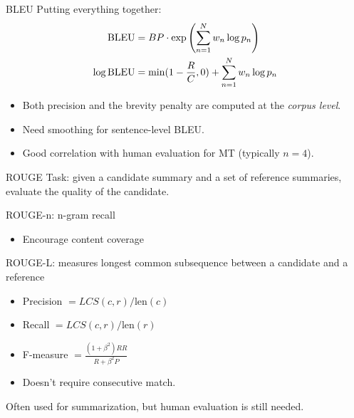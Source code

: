 \documentclass[usenames,dvipsnames,notes]{beamer}
\begin{document}
\begin{frame}
    {BLEU}
    Putting everything together:
    \begin{align*}
        \text{BLEU} &= BP\cdot \exp\left( \sum_{n=1}^N w_n \log p_n \right) \\
        \log \text{BLEU} &= \min(1-\frac{R}{C}, 0) + \sum_{n=1}^N w_n \log p_n
    \end{align*}

    \begin{itemize}
        \item Both precision and the brevity penalty are computed at the \emph{corpus level}.
        \item Need smoothing for sentence-level BLEU.
        \item Good correlation with human evaluation for MT (typically $n=4$).
    \end{itemize}
\end{frame}

\begin{frame}
    {ROUGE}
    Task: given a candidate summary and a set of reference summaries, evaluate the quality of the candidate.

    ROUGE-n: n-gram recall\\
    \begin{itemize}
        \item Encourage content coverage 
    \end{itemize}

    ROUGE-L: measures longest common subsequence between a candidate and a reference\\
    \begin{itemize}
        \item Precision $ = LCS(c, r) / \text{len}(c)$
        \item Recall $ = LCS(c, r) / \text{len}(r)$
        \item F-measure $ = \frac{(1+\beta^2)RR}{R + \beta^2 P}$
        \item Doesn't require consecutive match.
    \end{itemize}

    Often used for summarization, but human evaluation is still needed.
\end{frame}
\end{document}
